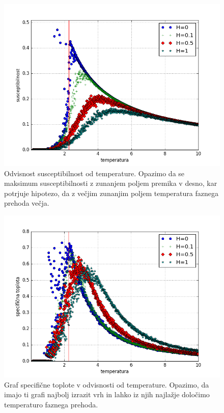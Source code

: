 \documentclass[slovene,11pt,a4paper]{article}
\numberwithin{equation}{section} %
\numberwithin{figure}{section} %
\numberwithin{table}{section} %
\begin{document}
\begin{figure}
\centering
\includegraphics[scale=0.7]{slike/susceptibilnost1.png}
\caption{Odvisnost susceptibilnost od temperature. Opazimo da se maksimum susceptibilnosti z zunanjem poljem premika v desno, kar potrjuje hipotezo, da z večjim zunanjim poljem temperatura faznega prehoda večja.}
\end{figure}


\begin{figure}
\centering
\includegraphics[scale=0.7]{slike/specificna1.png}
\caption{Graf specifične toplote v odvisnosti od temperature. Opazimo, da imajo ti grafi najbolj izrazit vrh in lahko iz njih najlažje določimo temperaturo faznega prehoda.}
\end{figure}
\end{document}
